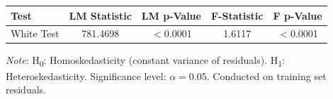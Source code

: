 \begin{tabular}{lcccc}
  \toprule
  \textbf{Test} & \textbf{LM Statistic} & \textbf{LM p-Value} & \textbf{F-Statistic} & \textbf{F p-Value} \\ 
  \midrule
  White Test & 781.4698 & $<$0.0001 & 1.6117 & $<$0.0001 \\ 
  \bottomrule
\end{tabular}
\par\vspace{4pt}
\begin{minipage}{\linewidth}
  \footnotesize \textit{Note}: H\textsubscript{0}: Homoskedasticity (constant variance of residuals). H\textsubscript{1}: Heteroskedasticity. Significance level: $\alpha = 0.05$. Conducted on training set residuals.
\end{minipage}
